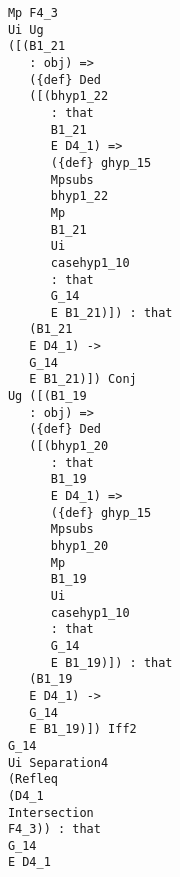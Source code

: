 \documentclass[12pt]{article}
\begin{document}
\begin{verbatim}
                                     Mp F4_3 
                                     Ui Ug 
                                     ([(B1_21 
                                        : obj) => 
                                        ({def} Ded 
                                        ([(bhyp1_22 
                                           : that 
                                           B1_21 
                                           E D4_1) => 
                                           ({def} ghyp_15 
                                           Mpsubs 
                                           bhyp1_22 
                                           Mp 
                                           B1_21 
                                           Ui 
                                           casehyp1_10 
                                           : that 
                                           G_14 
                                           E B1_21)]) : that 
                                        (B1_21 
                                        E D4_1) -> 
                                        G_14 
                                        E B1_21)]) Conj 
                                     Ug ([(B1_19 
                                        : obj) => 
                                        ({def} Ded 
                                        ([(bhyp1_20 
                                           : that 
                                           B1_19 
                                           E D4_1) => 
                                           ({def} ghyp_15 
                                           Mpsubs 
                                           bhyp1_20 
                                           Mp 
                                           B1_19 
                                           Ui 
                                           casehyp1_10 
                                           : that 
                                           G_14 
                                           E B1_19)]) : that 
                                        (B1_19 
                                        E D4_1) -> 
                                        G_14 
                                        E B1_19)]) Iff2 
                                     G_14 
                                     Ui Separation4 
                                     (Refleq 
                                     (D4_1 
                                     Intersection 
                                     F4_3)) : that 
                                     G_14 
                                     E D4_1 

\end{verbatim}
\end{document}

